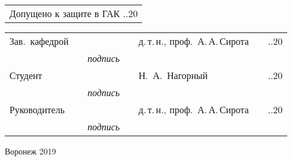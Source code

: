 \begin{titlepage}
\begin{tabularx}{\textwidth}{l}
Допущено к защите в ГАК \hspace{10mm} \underline{\hspace{5mm}}.\underline{\hspace{5mm}}.20\underline{\hspace{5mm}}\\
\end{tabularx}
\hfill \break
\vspace{5mm}
\begin{tabularx}{\textwidth}{llcllll}
Зав.~кафедрой & \hspace{2mm} & \underline{\hspace{15mm}} & \hspace{2mm} & д.\,т.\,н., проф.~А.\,А.\,Сирота
& \hspace{2mm} & \underline{\hspace{5mm}}.\underline{\hspace{5mm}}.20\underline{\hspace{5mm}} \\
&& {\footnotesize \textit{подпись}} &&&& \\
Студент & \hspace{2mm} & \underline{\hspace{15mm}} & \hspace{2mm} & Н.~А.~Нагорный & \hspace{2mm} & \underline{\hspace{5mm}}.\underline{\hspace{5mm}}.20\underline{\hspace{5mm}} \\
&& {\footnotesize \textit{подпись}} &&&& \\
Руководитель & \hspace{2mm} & \underline{\hspace{15mm}} & \hspace{2mm} & д.\,т.\,н., проф.~А.\,А.\,Сирота & \hspace{2mm} & \underline{\hspace{5mm}}.\underline{\hspace{5mm}}.20\underline{\hspace{5mm}} \\
&& {\footnotesize \textit{подпись}} &&&& \\

\end{tabularx}

\vspace*{\fill}

Воронеж 2019
\endgroup
\end{titlepage}

\setcounter{page}{2}
